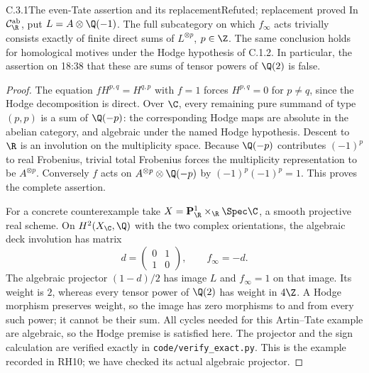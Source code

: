 \begin{result}{C.3.1}{The even-Tate assertion and its replacement}{Refuted; replacement proved}
In $\mathcal C_{\R}^{\mathrm{ab}}$, put $L=A\otimes\Q(-1)$. The full subcategory on which $f_\infty$ acts trivially consists exactly of finite direct sums of $L^{\otimes p}$, $p\in\Z$. The same conclusion holds for homological motives under the Hodge hypothesis of C.1.2. In particular, the assertion on 18:38 that these are sums of tensor powers of $\Q(2)$ is false.
\end{result}
\begin{proof}
The equation $fH^{p,q}=H^{q,p}$ with $f=1$ forces $H^{p,q}=0$ for $p\ne q$, since the Hodge decomposition is direct. Over $\C$, every remaining pure summand of type $(p,p)$ is a sum of $\Q(-p)$: the corresponding Hodge maps are absolute in the abelian category, and algebraic under the named Hodge hypothesis. Descent to $\R$ is an involution on the multiplicity space. Because $\Q(-p)$ contributes $(-1)^p$ to real Frobenius, trivial total Frobenius forces the multiplicity representation to be $A^{\otimes p}$. Conversely $f$ acts on $A^{\otimes p}\otimes\Q(-p)$ by $(-1)^p(-1)^p=1$. This proves the complete assertion.

For a concrete counterexample take $X=\mathbf P^1_\R\times_\R\Spec\C$, a smooth projective real scheme. On $H^2(X_\C,\Q)$ with the two complex orientations, the algebraic deck involution has matrix
\[
 d=\begin{pmatrix}0&1\\1&0\end{pmatrix},\qquad
 f_\infty=-d.
\]
The algebraic projector $(1-d)/2$ has image $L$ and $f_\infty=1$ on that image. Its weight is $2$, whereas every tensor power of $\Q(2)$ has weight in $4\Z$. A Hodge morphism preserves weight, so the image has zero morphisms to and from every such power; it cannot be their sum. All cycles needed for this Artin--Tate example are algebraic, so the Hodge premise is satisfied here. The projector and the sign calculation are verified exactly in \texttt{code/verify\_exact.py}. This is the example recorded in RH10; we have checked its actual algebraic projector.
\end{proof}

